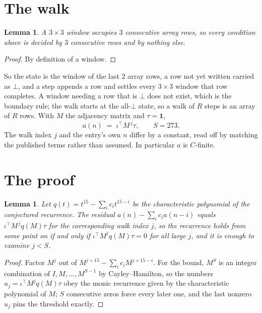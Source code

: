 \documentclass[11pt,a4paper]{article}
\theoremstyle{plain}
\newtheorem{lemma}[theorem]{Lemma}
\theoremstyle{definition}
\begin{document}
\section{The walk}

\begin{lemma}\label{lem:win}
A $3\times3$ window occupies $3$ consecutive array rows, so every condition above is
decided by $3$ consecutive rows and by nothing else.
\end{lemma}

\begin{proof}
By definition of a window.
\end{proof}

So the state is the window of the last $2$ array rows, a row not yet written carried as
$\bot$, and a step appends a row and settles every $3\times3$ window that row completes. A
window needing a row that is $\bot$ does not exist, which is the boundary rule; the walk starts
at the all-$\bot$ state, so a walk of $R$ steps is an array of $R$ rows. With $M$ the adjacency
matrix and $\tau=\mathbf{1}$,
\[
a(n)\;=\;\iota^{\!\top}M^{\,j}\tau ,\qquad S=273.
\]
The walk index $j$ and the entry's own $n$ differ by a constant, read off by matching the
published terms rather than assumed. In particular $a$ is $C$-finite.

\section{The proof}

\begin{lemma}\label{lem:crit}
Let $q(t)=t^{15}-\sum_i c_it^{15-i}$ be the characteristic polynomial of the
conjectured recurrence. The residual $a(n)-\sum_ic_ia(n-i)$ equals
$\iota^{\!\top}M^{\,j}q(M)\tau$ for the corresponding walk index $j$, so the recurrence
holds from some point on if and only if $\iota^{\!\top}M^{j}q(M)\tau=0$ for all large $j$,
and it is enough to examine $j<S$.
\end{lemma}

\begin{proof}
Factor $M^{j}$ out of $M^{j+15}-\sum_ic_iM^{j+15-i}$. For the bound, $M^{S}$
is an integer combination of $I,M,\dots,M^{S-1}$ by Cayley--Hamilton, so the numbers
$u_j=\iota^{\!\top}M^{j}q(M)\tau$ obey the monic recurrence given by the characteristic
polynomial of $M$; $S$ consecutive zeros force every later one, and the last nonzero $u_j$
pins the threshold exactly.
\end{proof}
\end{document}
